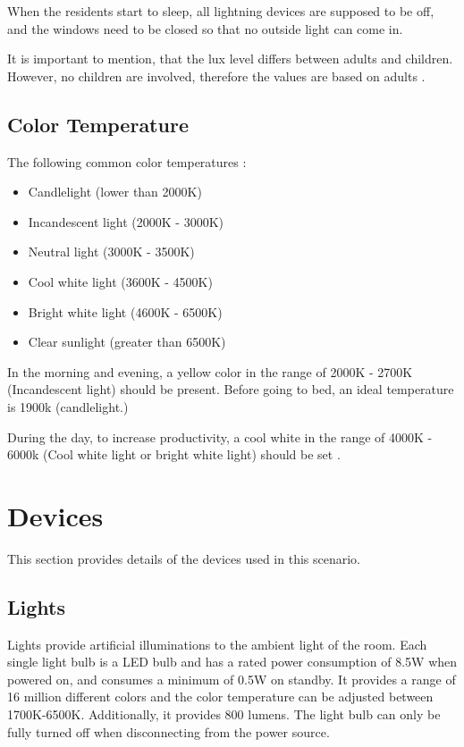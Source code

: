 \documentclass[letterpaper, 11pt]{Proposal}
\begin{document}
When the residents start to sleep, all lightning devices are supposed to be off, 
and the windows need to be closed so that no outside light can come in.

It is important to mention, that the lux level differs between adults and children.
However, no children are involved, therefore the values are based on adults \cite{SleepscoreLightAndTemp2022, AdamsLight2022}.

\subsection{Color Temperature}\label{subsec:02_metrics_temp}
The following common color temperatures  \cite{EspositoTemp2022}:
\begin{itemize}
    \item Candlelight (lower than 2000K)
    \item Incandescent light (2000K - 3000K)
    \item Neutral light (3000K - 3500K)
    \item Cool white light (3600K - 4500K)
    \item Bright white light (4600K - 6500K)
    \item Clear sunlight (greater than 6500K)
\end{itemize}

In the morning and evening, a yellow color in the range of 2000K - 2700K
(Incandescent light) should be present.
Before going to bed, an ideal temperature is 1900k (candlelight.)

During the day, to increase productivity, a cool white in the range of 4000K - 6000k 
(Cool white light or bright white light) should be set \cite{BestTemp2022}.

\section{Devices}\label{sec:03_devices}
This section provides details of the devices used in this scenario.

\subsection{Lights}\label{subsec:03_devices_lights}
Lights provide artificial illuminations to the ambient light of the room.
Each single light bulb is a LED bulb and has a rated power consumption 
of 8.5W when powered on, and consumes a minimum of 0.5W on standby. 
It provides a range of 16 million different colors and the color temperature 
can be adjusted between 1700K-6500K.
Additionally, it provides 800 lumens.
The light bulb can only be fully turned off when disconnecting from the power source.
\end{document}
